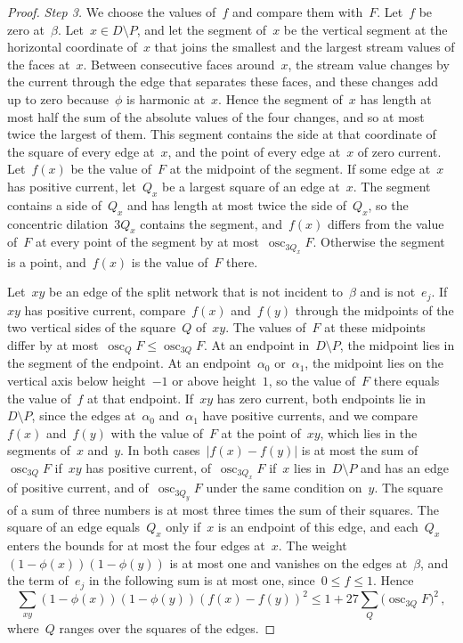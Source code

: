 \documentclass[11pt]{amsart}
\numberwithin{equation}{section}
\begin{document}
\begin{proof}
\emph{Step 3.} We choose the values of~$f$ and compare them with~$F$. Let~$f$ be zero at~$\beta$. Let~$x\in D\setminus P$, and let the segment of~$x$ be the vertical segment at the horizontal coordinate of~$x$ that joins the smallest and the largest stream values of the faces at~$x$. Between consecutive faces around~$x$, the stream value changes by the current through the edge that separates these faces, and these changes add up to zero because~$\phi$ is harmonic at~$x$. Hence the segment of~$x$ has length at most half the sum of the absolute values of the four changes, and so at most twice the largest of them. This segment contains the side at that coordinate of the square of every edge at~$x$, and the point of every edge at~$x$ of zero current. Let~$f(x)$ be the value of~$F$ at the midpoint of the segment. If some edge at~$x$ has positive current, let~$Q_x$ be a largest square of an edge at~$x$. The segment contains a side of~$Q_x$ and has length at most twice the side of~$Q_x$, so the concentric dilation~$3Q_x$ contains the segment, and~$f(x)$ differs from the value of~$F$ at every point of the segment by at most~$\operatorname{osc}_{3Q_x}F$. Otherwise the segment is a point, and~$f(x)$ is the value of~$F$ there.

Let~$xy$ be an edge of the split network that is not incident to~$\beta$ and is not~$e_j$. If~$xy$ has positive current, compare~$f(x)$ and~$f(y)$ through the midpoints of the two vertical sides of the square~$Q$ of~$xy$. The values of~$F$ at these midpoints differ by at most~$\operatorname{osc}_QF\leq\operatorname{osc}_{3Q}F$. At an endpoint in~$D\setminus P$, the midpoint lies in the segment of the endpoint. At an endpoint~$\alpha_0$ or~$\alpha_1$, the midpoint lies on the vertical axis below height~$-1$ or above height~$1$, so the value of~$F$ there equals the value of~$f$ at that endpoint. If~$xy$ has zero current, both endpoints lie in~$D\setminus P$, since the edges at~$\alpha_0$ and~$\alpha_1$ have positive currents, and we compare~$f(x)$ and~$f(y)$ with the value of~$F$ at the point of~$xy$, which lies in the segments of~$x$ and~$y$. In both cases~$|f(x)-f(y)|$ is at most the sum of~$\operatorname{osc}_{3Q}F$ if~$xy$ has positive current, of~$\operatorname{osc}_{3Q_x}F$ if~$x$ lies in~$D\setminus P$ and has an edge of positive current, and of~$\operatorname{osc}_{3Q_y}F$ under the same condition on~$y$. The square of a sum of three numbers is at most three times the sum of their squares. The square of an edge equals~$Q_x$ only if~$x$ is an endpoint of this edge, and each~$Q_x$ enters the bounds for at most the four edges at~$x$. The weight~$(1-\phi(x))(1-\phi(y))$ is at most one and vanishes on the edges at~$\beta$, and the term of~$e_j$ in the following sum is at most one, since~$0\leq f\leq1$. Hence
\begin{equation*}
 \sum_{xy}(1-\phi(x))(1-\phi(y))(f(x)-f(y))^2\leq1+27\sum_Q\bigl(\operatorname{osc}_{3Q}F\bigr)^2\,,
\end{equation*}
where~$Q$ ranges over the squares of the edges.


\end{proof}
\end{document}
